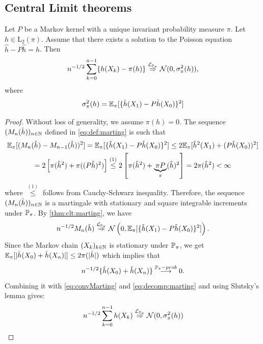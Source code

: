 \documentclass[english,graybox,envcountchap,envcountsame,sectrefs,shortlabels]{svmono}
\theoremstyle{style}
\newenvironment{svmultproof}{\small \begin{proof}}{\end{proof}}
\newcommand{\ltwo}{\mathrm{L}_2}
\newcommand{\dlim}[1]{\stackrel{\mathcal{L}_{#1}}{\Rightarrow}}
\newcommand{\plim}[1]{\stackrel{#1-prob}{\longrightarrow}}
\newcommand{\gauss}{\mathcal{N}}
\newcommand{\eqsp}{}
\begin{document}
\subsection{Central Limit theorems}

\begin{shaded}
 \begin{theorem}
  \label{thm:clt-poisson} 
  Let $P$ be a  Markov kernel with a unique invariant probability measure $\pi$. Let
  $h \in \ltwo(\pi)$. Assume that there exists a solution
  \fbox{$\hat{h} \in \ltwo(\pi)$} to the Poisson equation $\hat{h} - P \hat{h} = h$. Then
  \begin{align*}
    n^{-1/2} \sum_{k=0}^{n-1} \{h(X_k)-\pi(h)\} \dlim{\PP_\pi} \gauss(0,\sigma_\pi^2(h)) \eqsp ,
  \end{align*}
  where
  \begin{equation}
  \label{eq:equality-variance}
  \sigma_\pi^2(h) = \PE_\pi[ \{\hat{h}(X_1)-P\hat{h}(X_0)\}^2] %
  \end{equation}
\end{theorem}

\end{shaded}

\begin{svmultproof}
Without loss of generality, we assume $\pi(h)=0$.
  The sequence $(M_n(\hat h))_{n \in \mathbb{N}}$ defined in
  \eqref{eq:def:marting} is such that
  \begin{multline*}
\mathbb{E}_\pi[(M_n(\hat h)-M_{n-1}(\hat h))^2]=\mathbb{E}_\pi[ \{\hat{h}(X_1)-P\hat{h}(X_0)\}^2] \leq 2 \mathbb{E}_\pi[ \hat{h}^2(X_1)+(P\hat{h}(X_0))^2]  \\
= 2 \left[\pi(\hat h^2) +\pi( (P\hat h)^2)\right]  \stackrel{(1)}{\leq} 2 \left[\pi(\hat h^2) +\underbrace{\pi P}_{\pi}(\hat h)^2\right]=2\pi(\hat h^2)<\infty
  \end{multline*}
  where $\stackrel{(1)}{\leq}$ follows from Cauchy-Schwarz inequality.
 Therefore,  the sequence $(M_n(\hat h))_{n \in \mathbb{N}}$ is a martingale with stationary and square integrable increments under $\mathbb{P}_\pi$. By \autoref{thm:clt:marting}, we have
  \begin{equation} \label{eq:convMarting}
  n^{-1/2} M_n(\hat h) \dlim{\PP_\pi} \gauss\left(0, \PE_\pi[ \{\hat{h}(X_1)-P\hat{h}(X_0)\}^2] \right) \eqsp.
  \end{equation}
 Since the Markov chain $(X_k)_{k\in\mathbb{N}}$ is stationary under $\mathbb{P}_\pi$, we get
  $\mathbb{E}_\pi[|\hat{h}(X_0)+\hat{h}(X_n)|] \leq 2 \pi(|\hat{h}|)$ which implies that
  \[
  n^{-1/2} \{\hat{h}(X_0)+\hat{h}(X_n)\}\plim{\PP_\pi}0 \eqsp.
  \]
Combining it with \eqref{eq:convMarting} and \eqref{eq:decomp:marting} and using Slutsky's lemma gives:
$$
    n^{-1/2} \sum_{k=0}^{n-1} h(X_k) \dlim{\PP_\pi} \gauss(0,\sigma_\pi^2(h))
$$
\end{svmultproof}
\end{document}
